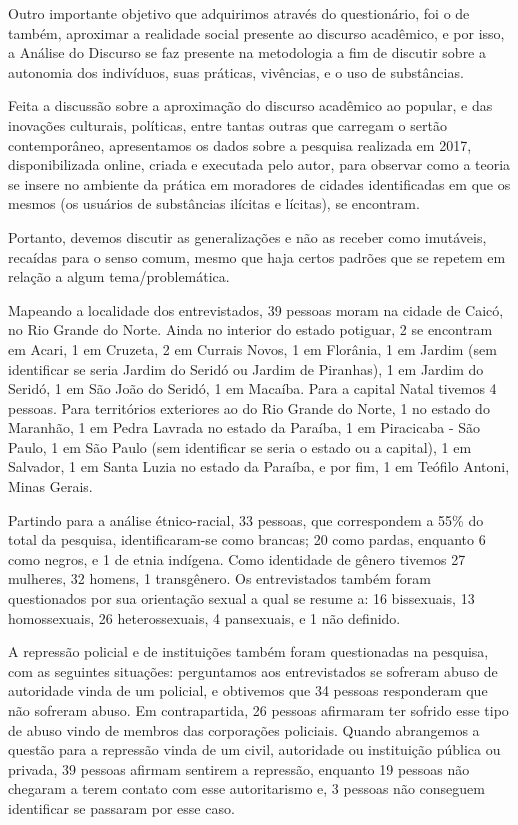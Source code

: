 \begin{refsection}
    Outro importante objetivo que adquirimos através do questionário, foi o de também, aproximar a realidade social presente ao discurso acadêmico, e por isso, a Análise do Discurso se faz presente na metodologia a fim de discutir sobre a autonomia dos indivíduos, suas práticas, vivências, e o uso de substâncias. 

    Feita a discussão sobre a aproximação do discurso acadêmico ao popular, e das inovações culturais, políticas, entre tantas outras que carregam o sertão contemporâneo, apresentamos os dados sobre a pesquisa realizada em 2017, disponibilizada online, criada e executada pelo autor, para observar como a teoria se insere no ambiente da prática em moradores de cidades identificadas em que os mesmos (os usuários de substâncias ilícitas e lícitas), se encontram.  

    Portanto, devemos discutir as generalizações e não as receber como imutáveis, recaídas para o senso comum, mesmo que haja certos padrões que se repetem em relação a algum tema/problemática.  

    Mapeando a localidade dos entrevistados, 39 pessoas moram na cidade de Caicó, no Rio Grande do Norte. Ainda no interior do estado potiguar, 2 se encontram em Acari, 1 em Cruzeta, 2 em Currais Novos, 1 em Florânia, 1 em Jardim (sem identificar se seria Jardim do Seridó ou Jardim de Piranhas), 1 em Jardim do Seridó, 1 em São João do Seridó, 1 em Macaíba. Para a capital Natal tivemos 4 pessoas. Para territórios exteriores ao do Rio Grande do Norte, 1 no estado do Maranhão, 1 em Pedra Lavrada no estado da Paraíba, 1 em Piracicaba - São Paulo, 1 em São Paulo (sem identificar se seria o estado ou a capital), 1 em Salvador, 1 em Santa Luzia no estado da Paraíba, e por fim, 1 em Teófilo Antoni, Minas Gerais. 

    Partindo para a análise étnico-racial, 33 pessoas, que correspondem a 55\% do total da pesquisa, identificaram-se como brancas; 20 como pardas, enquanto 6 como negros, e 1 de etnia indígena. Como identidade de gênero tivemos 27 mulheres, 32 homens, 1 transgênero. Os entrevistados também foram questionados por sua orientação sexual a qual se resume a: 16 bissexuais, 13 homossexuais, 26 heterossexuais, 4 pansexuais, e 1 não definido.

    A repressão policial e de instituições também foram questionadas na pesquisa, com as seguintes situações: perguntamos aos entrevistados se sofreram abuso de autoridade vinda de um policial, e obtivemos que 34 pessoas responderam que não sofreram abuso. Em contrapartida, 26 pessoas afirmaram ter sofrido esse tipo de abuso vindo de membros das corporações policiais. Quando abrangemos a questão para a repressão vinda de um civil, autoridade ou instituição pública ou privada, 39 pessoas afirmam sentirem a repressão, enquanto 19 pessoas não chegaram a terem contato com esse autoritarismo e, 3 pessoas não conseguem identificar se passaram por esse caso. 


\end{refsection}
